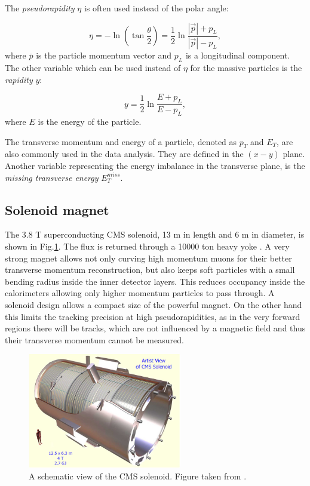 The \textit{pseudorapidity} $\eta$ is often used instead of the polar angle:

\begin{equation}\label{eq:eta}
  \eta = -\ln(\tan\frac{\theta}{2}) = \frac{1}{2}\ln\frac{|\vec{p}| + p_{L}}{|\vec{p}| - p_{L}},
\end{equation}
where $\bar{p}$ is the particle momentum vector and $p_{L}$ is a longitudinal component.
The other variable which can be used instead of $\eta$ for the massive particles is the \textit{rapidity} $y$:

\begin{equation}\label{eq:y}
  y = \frac{1}{2}\ln\frac{E + p_{L}}{E - p_{L}},
\end{equation} 
where $E$ is the energy of the particle.

The transverse momentum and energy of a particle, denoted as $p_{T}$ and $E_T$, are also commonly used in the data analysis. 
They are defined in the $(x-y)$ plane. Another variable representing the energy imbalance in the transverse plane, is the
\textit{missing transverse energy} $E_{T}^{miss}$.

\subsection{Solenoid magnet}\label{ssec:solenoid}

The 3.8 T superconducting CMS solenoid, 13 m in length and 6 m in diameter, is shown in Fig.\ref{fig:solenoid}. 
The flux is returned through a 10000 ton heavy yoke \cite{CMSatLHC}. A very strong magnet allows not only curving
high momentum muons for their better transverse  momentum reconstruction, but also keeps soft particles with a small bending radius
inside the inner detector layers. This reduces occupancy inside the calorimeters allowing only higher
momentum particles to pass through. A solenoid design allows a compact size of the powerful magnet.
On the other hand this limits the tracking precision at high pseudorapidities, as in the very forward regions there will be 
tracks, which are not influenced by a magnetic field\cite{Dissertori:2010xe} and thus their transverse momentum cannot be measured.


\begin{figure}[t]
  \centering
  \includegraphics[width=0.6\textwidth]{02_experimental_setup/plots/CERN_CMS_Solenoid_schematic.jpg}
  \caption{A schematic view of the CMS solenoid. Figure taken from \cite{LCCNews}.}
  \label{fig:solenoid}
\end{figure}

